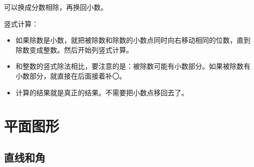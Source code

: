 \documentclass[12pt,UTF8]{ctexbook}
\begin{document}
可以换成分数相除，再换回小数。

竖式计算：

\begin{itemize}
\item 如果除数是小数，就把被除数和除数的小数点同时向右移动相同的位数，直到除数变成整数。然后开始列竖式计算。
\item 和整数的竖式除法相比，要注意的是：被除数可能有小数部分。如果被除数有小数部分，就直接在后面接着补〇。
\item 计算的结果就是真正的结果。不需要把小数点移回去了。
\end{itemize}


\section{平面图形}

\subsection{直线和角}
\end{document}

